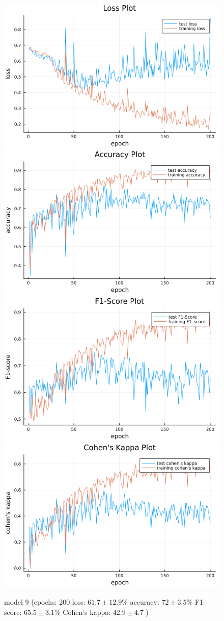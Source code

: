 \documentclass[
a4paper, 
12pt,
grayscalebody, %
abstract=on,
twoside, BCOR10mm, 12pt, DIV13,headinclude, footexclude, final, abstracton, openright
]{ibireprt}
\numberwithin{equation}{chapter}
\numberwithin{table}{chapter}
\numberwithin{figure}{chapter}
\numberwithin{algorithm}{chapter}
\numberwithin{example}{chapter}
\numberwithin{example}{chapter}
\begin{document}
\begin{figure}
	\includegraphics[width=0.4\linewidth]{loss_png_13_3.png}\hfill
	\includegraphics[width=0.4\linewidth]{accuracy_png_13_3.png}
	\\[\smallskipamount]
	\includegraphics[width=0.4\linewidth]{f1_score_png_13_3.png}\hfill
	\includegraphics[width=0.4\linewidth]{cohens_kappa_png_13_3.png}
	\caption{model 9 (epochs: 200 loss: $61.7\pm12.9\% $ accuracy: $72\pm3.5\%$ F1-score: $65.5\pm3.1\%$  Cohen's kappa: $42.9\pm4.7$ )}
\end{figure}
\end{document}
